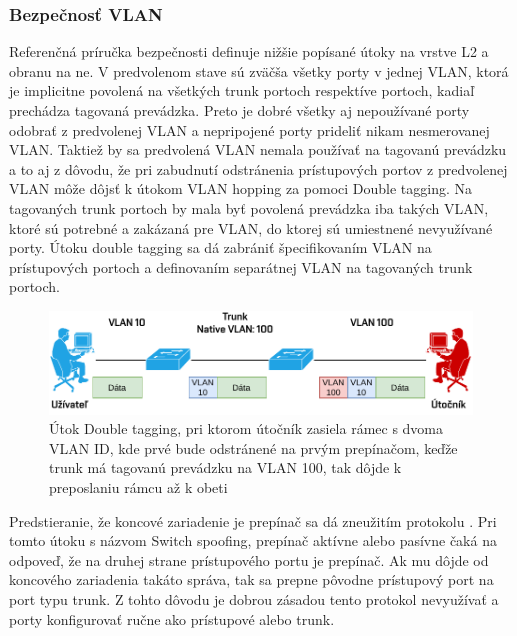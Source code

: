 \subsubsection*{Bezpečnosť VLAN}
Referenčná príručka bezpečnosti \cite{uYLsMtQInofenpV3} definuje nižšie popísané útoky na vrstve L2 a obranu na ne. V predvolenom stave sú zväčša všetky porty v jednej VLAN, ktorá je implicitne povolená na všetkých trunk portoch respektíve portoch, kadiaľ prechádza tagovaná prevádzka. Preto je dobré všetky aj nepoužívané porty odobrať z predvolenej VLAN a nepripojené porty prideliť nikam nesmerovanej VLAN. Taktiež by sa predvolená VLAN nemala používať na tagovanú prevádzku a to aj z dôvodu, že pri zabudnutí odstránenia prístupových portov z predvolenej VLAN môže dôjsť k útokom VLAN hopping za pomoci Double tagging. Na tagovaných trunk portoch by mala byť povolená prevádzka iba takých VLAN, ktoré sú potrebné a zakázaná pre VLAN, do ktorej sú umiestnené nevyužívané porty. Útoku double tagging sa dá zabrániť špecifikovaním VLAN na prístupových portoch a definovaním separátnej VLAN na tagovaných trunk portoch.

\begin{figure}[H]
	\begin{center}
		\includegraphics[scale=0.75]{obrazky/double-tagging.pdf}
	\end{center}
	\caption[VLAN Hopping s Double Tagging]{Útok Double tagging, pri ktorom útočník zasiela rámec s dvoma VLAN ID, kde prvé bude odstránené na prvým prepínačom, keďže trunk má tagovanú prevádzku na VLAN 100, tak dôjde k preposlaniu rámcu až k obeti \cite{srOo9OPXJxHjPBgo}}
	\label{fig:double-tagging}
\end{figure} 

Predstieranie, že koncové zariadenie je prepínač sa dá zneužitím protokolu  \cite{uYLsMtQInofenpV3}. Pri tomto útoku s názvom Switch spoofing, prepínač aktívne alebo pasívne čaká na odpoveď, že na druhej strane prístupového portu je prepínač. Ak mu dôjde od koncového zariadenia takáto správa, tak sa prepne pôvodne prístupový port na port typu trunk. Z tohto dôvodu je dobrou zásadou tento protokol nevyužívať a porty konfigurovať ručne ako prístupové alebo trunk.

